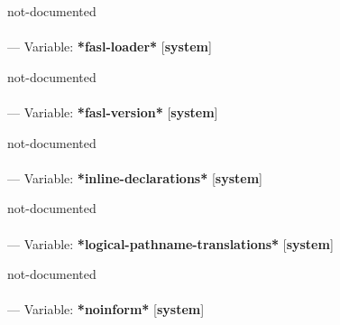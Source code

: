 \begin{adjustwidth}{5em}{5em}
not-documented
\end{adjustwidth}

\paragraph{}
\label{SYSTEM:*FASL-LOADER*}
--- Variable: \textbf{*fasl-loader*} [\textbf{system}] \textit{}

\begin{adjustwidth}{5em}{5em}
not-documented
\end{adjustwidth}

\paragraph{}
\label{SYSTEM:*FASL-VERSION*}
--- Variable: \textbf{*fasl-version*} [\textbf{system}] \textit{}

\begin{adjustwidth}{5em}{5em}
not-documented
\end{adjustwidth}

\paragraph{}
\label{SYSTEM:*INLINE-DECLARATIONS*}
--- Variable: \textbf{*inline-declarations*} [\textbf{system}] \textit{}

\begin{adjustwidth}{5em}{5em}
not-documented
\end{adjustwidth}

\paragraph{}
\label{SYSTEM:*LOGICAL-PATHNAME-TRANSLATIONS*}
--- Variable: \textbf{*logical-pathname-translations*} [\textbf{system}] \textit{}

\begin{adjustwidth}{5em}{5em}
not-documented
\end{adjustwidth}

\paragraph{}
\label{SYSTEM:*NOINFORM*}
--- Variable: \textbf{*noinform*} [\textbf{system}] \textit{}


